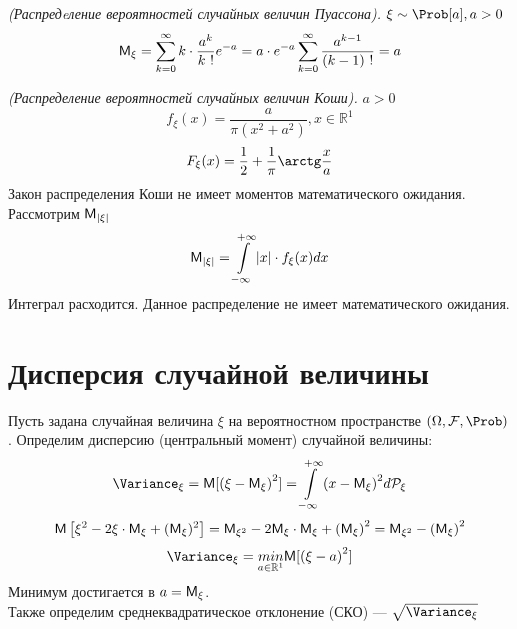 \begin{example} \textit{(Распредeление вероятностей случайных величин Пуассона).} $\xi \sim \Prob [a], a > 0$
  \[
    \mathsf{M}_{\xi} = \sum\limits_{k = 0}^{\infty} k \cdot \frac{a^k}{k \ !} e^{-a} = a \cdot e^{-a} \sum\limits_{k = 0}^{\infty} \frac{a^{k-1}}{(k-1) \ !} = a
  \]
\end{example}
\begin{example} \textit{(Распределение вероятностей случайных величин Коши).}
  $a > 0$
  \[
    f_{\xi} (x) = \frac{a}{\pi (x^2 + a^2)}, x \in \mathbb{R}^1
  \]
  \[
    F_{\xi} (x) = \frac{1}{2} + \frac{1}{\pi} \arctg \frac{x}{a}
  \]
  Закон распределения Коши не имеет моментов математического ожидания. Рассмотрим $\mathsf{M}_{|\xi|}$
  \[
    \mathsf{M}_{|\xi|} = \int\limits_{-\infty}^{+\infty} |x| \cdot f_{\xi} (x) dx
  \]
  Интеграл расходится. Данное распределение не имеет математического ожидания.
\end{example}

\setcounter{equation}{0}
\section{Дисперсия случайной величины}
Пусть задана случайная величина $\xi$ на вероятностном пространстве $(\Omega, \mathcal{F}, \Prob)$. Определим дисперсию (центральный момент) случайной величины:
\[
  \Variance_{\xi} = \MExpect [ {(\xi - \MExpect_{\xi})}^2] = \int\limits_{-\infty}^{+\infty} {(x - \MExpect_{\xi})}^2 d \mathcal{P}_{\xi}
\]
\[
  \mathsf{M} \left[ \xi^2 - 2 \xi \cdot \mathsf{M}_{\xi} + (\mathsf{M}_{\xi})^2 \right] = \mathsf{M}_{\xi^2} - 2 \mathsf{M}_{\xi} \cdot \mathsf{M}_{\xi} + {(\mathsf{M}_{\xi})}^2 = \mathsf{M}_{\xi^2} - {(\mathsf{M}_{\xi})}^2
\]
\[
  \Variance_{\xi} = \underset{a \in \mathbb{R}^1}{min} \MExpect [{(\xi - a)}^2]
\]
Минимум достигается в $a = \mathsf{M}_{\xi}$. \\
Также определим среднеквадратическое отклонение (СКО) --- $\sqrt{\Variance_{\xi}}$
